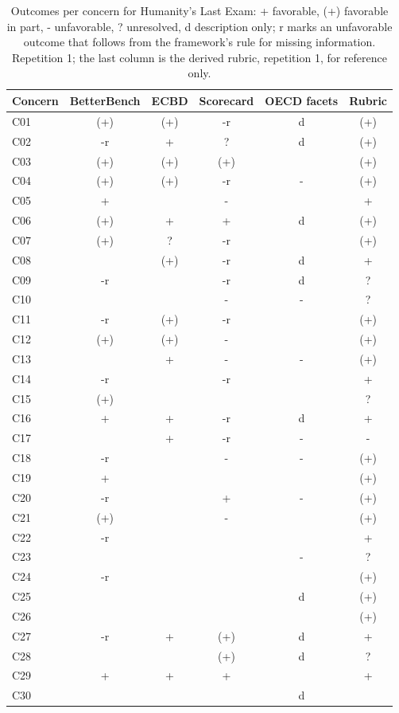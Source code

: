 \begin{table}[t]
\caption{Outcomes per concern for Humanity's Last Exam: + favorable, (+) favorable in part, - unfavorable, ? unresolved, d description only; r marks an unfavorable outcome that follows from the framework's rule for missing information. Repetition 1; the last column is the derived rubric, repetition 1, for reference only.}
\label{tab:grid-hle}
\small\centering\begin{tabular}{lccccc}\toprule
Concern & BetterBench & ECBD & Scorecard & OECD facets & Rubric \\
\midrule
C01 & (+) & (+) & -r & d & (+) \\
C02 & -r & + & ? & d & (+) \\
C03 & (+) & (+) & (+) &  & (+) \\
C04 & (+) & (+) & -r & - & (+) \\
C05 & + &  & - &  & + \\
C06 & (+) & + & + & d & (+) \\
C07 & (+) & ? & -r &  & (+) \\
C08 &  & (+) & -r & d & + \\
C09 & -r &  & -r & d & ? \\
C10 &  &  & - & - & ? \\
C11 & -r & (+) & -r &  & (+) \\
C12 & (+) & (+) & - &  & (+) \\
C13 &  & + & - & - & (+) \\
C14 & -r &  & -r &  & + \\
C15 & (+) &  &  &  & ? \\
C16 & + & + & -r & d & + \\
C17 &  & + & -r & - & - \\
C18 & -r &  & - & - & (+) \\
C19 & + &  &  &  & (+) \\
C20 & -r &  & + & - & (+) \\
C21 & (+) &  & - &  & (+) \\
C22 & -r &  &  &  & + \\
C23 &  &  &  & - & ? \\
C24 & -r &  &  &  & (+) \\
C25 &  &  &  & d & (+) \\
C26 &  &  &  &  & (+) \\
C27 & -r & + & (+) & d & + \\
C28 &  &  & (+) & d & ? \\
C29 & + & + & + &  & + \\
C30 &  &  &  & d &  \\
\bottomrule\end{tabular}
\end{table}
